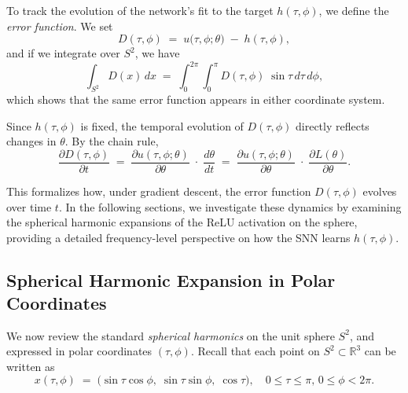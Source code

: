 \documentclass[review,onefignum,onetabnum,onealgnum]{siamart250106}
\numberwithin{theorem}{section}
\begin{document}
To track the evolution of the network’s fit to the target \(h(\tau,\phi)\), we define the \emph{error function}.  We set
\begin{equation}\label{errorxi-sphere}
    D(\tau,\phi)
\;=\;
u\bigl(\tau,\phi;\theta\bigr)
\;-\;
h(\tau,\phi),
\end{equation}
and if we integrate over \(S^2\), we have
\[
\int_{S^2}D(x)\,dx
\;=\;
\int_{0}^{2\pi}\!\!\int_{0}^{\pi}
D(\tau,\phi)\;\sin\tau\,d\tau\,d\phi,
\]
which shows that the same error function appears in either coordinate system.

Since \(h(\tau,\phi)\) is fixed, the temporal evolution of \(D(\tau,\phi)\) directly reflects changes in \(\theta\).  By the chain rule,
\begin{equation}\label{changeofD-sphere}
\frac{\partial D(\tau,\phi)}{\partial t}
\;=\;
\frac{\partial u(\tau,\phi;\theta)}{\partial \theta}
\;\cdot\;
\frac{d\theta}{dt}
\;=\;
\frac{\partial u(\tau,\phi;\theta)}{\partial \theta}
\;\cdot\;
\frac{\partial L(\theta)}{\partial \theta}.
\end{equation}

This formalizes how, under gradient descent, the error function \(D(\tau,\phi)\) evolves over time \(t\).  In the following sections, we investigate these dynamics by examining the spherical harmonic expansions of the ReLU activation on the sphere, providing a detailed frequency-level perspective on how the SNN learns \(h(\tau,\phi)\).

\subsection{Spherical Harmonic Expansion in Polar Coordinates}

We now review the standard \emph{spherical harmonics} on the unit sphere \(S^2\), and expressed in polar coordinates \((\tau,\phi)\).  Recall that each point on \(S^2\subset\mathbb{R}^3\) can be written as
\[
x(\tau,\phi) \;=\; 
\bigl(\sin\tau\cos\phi,\;\sin\tau\sin\phi,\;\cos\tau\bigr),
\quad
0\le\tau\le\pi,\,
0\le\phi<2\pi.
\]
\end{document}
